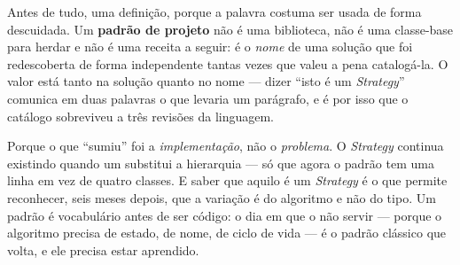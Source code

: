 Antes de tudo, uma definição, porque a palavra costuma ser usada de forma
descuidada. Um \textbf{padrão de projeto} não é uma biblioteca, não é uma
classe-base para herdar e não é uma receita a seguir: é o \emph{nome} de uma
solução que foi redescoberta de forma independente tantas vezes que valeu a
pena catalogá-la. O valor está tanto na solução quanto no nome --- dizer ``isto
é um \emph{Strategy}'' comunica em duas palavras o que levaria um parágrafo, e
é por isso que o catálogo sobreviveu a três revisões da linguagem.

\begin{porque}
Porque o que ``sumiu'' foi a \emph{implementação}, não o \emph{problema}. O
\emph{Strategy} continua existindo quando um  substitui a
hierarquia --- só que agora o padrão tem uma linha em vez de quatro classes. E
saber que aquilo é um \emph{Strategy} é o que permite reconhecer, seis meses
depois, que a variação é do algoritmo e não do tipo. Um padrão é vocabulário
antes de ser código: o dia em que o  não servir --- porque
o algoritmo precisa de estado, de nome, de ciclo de vida --- é o padrão clássico
que volta, e ele precisa estar aprendido.
\end{porque}

